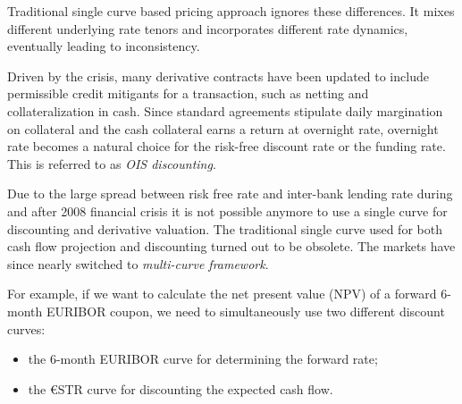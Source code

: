 Traditional single curve based pricing approach ignores these differences. It mixes different underlying rate tenors and incorporates different rate dynamics, eventually leading to inconsistency.

Driven by the crisis, many derivative contracts have been updated to include permissible credit mitigants for a transaction, such as netting and collateralization in cash. Since standard agreements stipulate daily margination on collateral and the cash collateral earns a return at overnight rate, overnight rate becomes a natural choice for the risk-free discount rate or the funding rate. This is referred to as \emph{OIS discounting}.

Due to the large spread between risk free rate and inter-bank lending rate during and after 2008 financial crisis it is not possible anymore to use a single curve for discounting and derivative valuation. The traditional single curve used for both cash flow projection and discounting turned out to be obsolete. The markets have since nearly switched to \emph{multi-curve framework}. 

For example, if we want to calculate the net present value (NPV) of a forward 6-month EURIBOR coupon, we need to simultaneously use two different discount curves: 

\begin{itemize}
\tightlist
\item the 6-month EURIBOR curve for determining the forward rate;
\item the \euro STR curve for discounting the expected cash flow.
\end{itemize}


